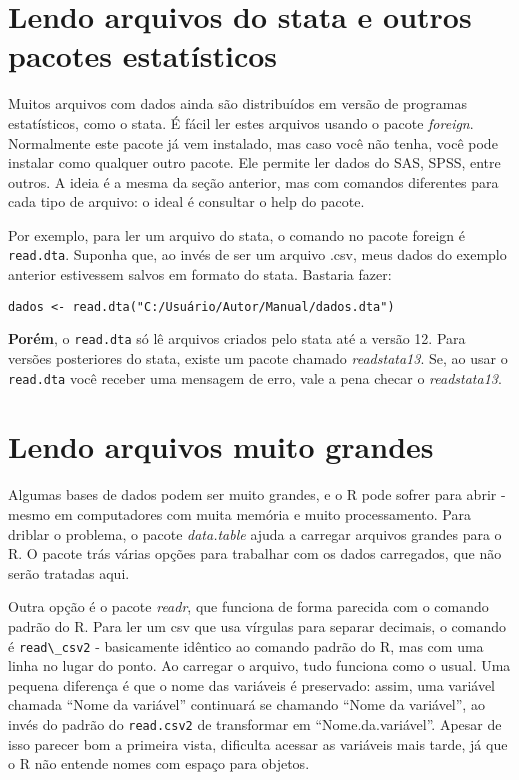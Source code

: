 \documentclass[]{book}
\begin{document}
\section{Lendo arquivos do stata e outros pacotes
estatísticos}\label{lendo-arquivos-do-stata-e-outros-pacotes-estatisticos}

Muitos arquivos com dados ainda são distribuídos em versão de programas
estatísticos, como o stata. É fácil ler estes arquivos usando o pacote
\emph{foreign}. Normalmente este pacote já vem instalado, mas caso você
não tenha, você pode instalar como qualquer outro pacote. Ele permite
ler dados do SAS, SPSS, entre outros. A ideia é a mesma da seção
anterior, mas com comandos diferentes para cada tipo de arquivo: o ideal
é consultar o help do pacote.

Por exemplo, para ler um arquivo do stata, o comando no pacote foreign é
\texttt{read.dta}. Suponha que, ao invés de ser um arquivo .csv, meus
dados do exemplo anterior estivessem salvos em formato do stata.
Bastaria fazer:

\begin{verbatim}
dados <- read.dta("C:/Usuário/Autor/Manual/dados.dta")
\end{verbatim}

\textbf{Porém}, o \texttt{read.dta} só lê arquivos criados pelo stata
até a versão 12. Para versões posteriores do stata, existe um pacote
chamado \emph{readstata13}. Se, ao usar o \texttt{read.dta} você receber
uma mensagem de erro, vale a pena checar o \emph{readstata13}.

\section{Lendo arquivos muito
grandes}\label{lendo-arquivos-muito-grandes}

Algumas bases de dados podem ser muito grandes, e o R pode sofrer para
abrir - mesmo em computadores com muita memória e muito processamento.
Para driblar o problema, o pacote \emph{data.table} ajuda a carregar
arquivos grandes para o R. O pacote trás várias opções para trabalhar
com os dados carregados, que não serão tratadas aqui.

Outra opção é o pacote \emph{readr}, que funciona de forma parecida com
o comando padrão do R. Para ler um csv que usa vírgulas para separar
decimais, o comando é \texttt{read\textbackslash{}\_csv2} - basicamente
idêntico ao comando padrão do R, mas com uma linha no lugar do ponto. Ao
carregar o arquivo, tudo funciona como o usual. Uma pequena diferença é
que o nome das variáveis é preservado: assim, uma variável chamada
``Nome da variável'' continuará se chamando ``Nome da variável'', ao
invés do padrão do \texttt{read.csv2} de transformar em
``Nome.da.variável''. Apesar de isso parecer bom a primeira vista,
dificulta acessar as variáveis mais tarde, já que o R não entende nomes
com espaço para objetos.
\end{document}
